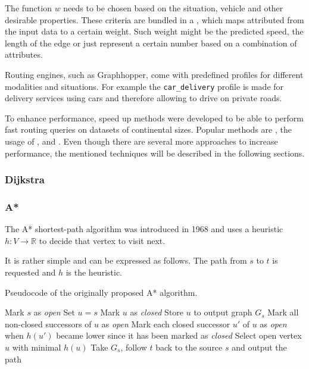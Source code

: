 		The function $w$ needs to be chosen based on the situation, vehicle and other desirable properties.
		These criteria are bundled in a , which maps attributed from the input data to a certain weight.
		Such weight might be the predicted speed\cite{graphhopper-profile-bike-speeds}, the length of the edge\cite{graphhopper-profile-shortest} or just represent a certain number based on a combination of attributes\cite{graphhopper-profile-short-fastest}.
		
		Routing engines, such as Graphhopper, come with predefined profiles for different modalities and situations.
		For example the \texttt{car\_delivery} profile is made for delivery services using cars and therefore allowing to drive on private roads\cite{graphhopper-routing-profiles}.
		
		To enhance performance, speed up methods were developed to be able to perform fast routing queries on datasets of continental sizes.
		Popular methods are , the usage of ,  and .
		Even though there are several more approaches to increase performance, the mentioned techniques will be described in the following sections.
		
		\subsubsection{Dijkstra}
		
		\subsubsection{A*}
		\label{subsubsec:astar}
		
			The A* shortest-path algorithm was introduced in 1968 and uses a heuristic $h : V \rightarrow \mathbb{R}$ to decide that vertex to visit next.
			
			It is rather simple and can be expressed as follows.
			The path from $s$ to $t$ is requested and $h$ is the heuristic.
			
			\begin{algorithm}
				\caption{Pseudocode of the originally proposed A* algorithm.}
				\begin{algorithmic}
					\State Mark $s$ as \emph{open}
					\State Set $u = s$
						\State Mark $u$ as \emph{closed}
						\State Store $u$ to output graph $G_s$
						\State Mark all non-closed successors of $u$ as \emph{open}
						\State Mark each closed successor $u'$ of $u$ as \emph{open} when $h(u')$ became lower since it has been marked as \emph{closed}
						\State Select open vertex $u$ with minimal $h(u)$
					\EndWhile
					\State Take $G_s$, follow $t$ back to the source $s$ and output the path
				\end{algorithmic}
			\end{algorithm}
		
